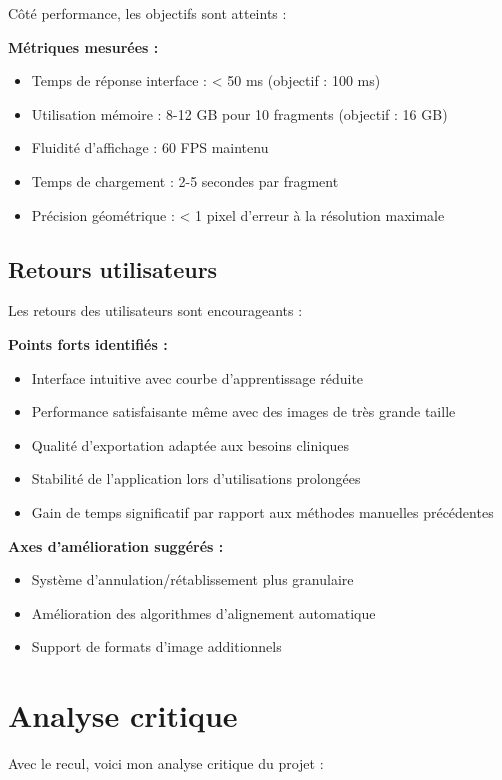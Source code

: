 \documentclass[11pt,a4paper]{report}
\begin{document}
Côté performance, les objectifs sont atteints :

\textbf{Métriques mesurées :}
\begin{itemize}
\item Temps de réponse interface : < 50 ms (objectif : 100 ms)
\item Utilisation mémoire : 8-12 GB pour 10 fragments (objectif : 16 GB)
\item Fluidité d'affichage : 60 FPS maintenu
\item Temps de chargement : 2-5 secondes par fragment
\item Précision géométrique : < 1 pixel d'erreur à la résolution maximale
\end{itemize}

\subsection{Retours utilisateurs}

Les retours des utilisateurs sont encourageants :

\textbf{Points forts identifiés :}
\begin{itemize}
\item Interface intuitive avec courbe d'apprentissage réduite
\item Performance satisfaisante même avec des images de très grande taille
\item Qualité d'exportation adaptée aux besoins cliniques
\item Stabilité de l'application lors d'utilisations prolongées
\item Gain de temps significatif par rapport aux méthodes manuelles précédentes
\end{itemize}

\textbf{Axes d'amélioration suggérés :}
\begin{itemize}
\item Système d'annulation/rétablissement plus granulaire
\item Amélioration des algorithmes d'alignement automatique
\item Support de formats d'image additionnels
\end{itemize}

\section{Analyse critique}

Avec le recul, voici mon analyse critique du projet :
\end{document}
